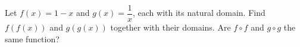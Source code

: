 Let $f(x)=1-x$ and $g(x)=\dfrac{1}{x}$, each with its natural domain. Find $f(f(x))$ and $g(g(x))$ together with their domains. Are $f\circ f$ and $g\circ g$ the same function?
